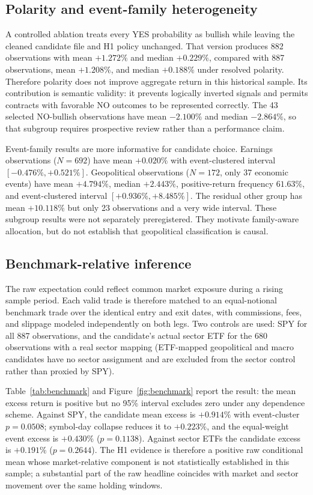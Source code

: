 \documentclass[sigconf,anonymous]{acmart}
\begin{document}
\subsection{Polarity and event-family heterogeneity}

A controlled ablation treats every YES probability as bullish while leaving the cleaned candidate file and H1 policy unchanged. That version produces 882 observations with mean $+1.272\%$ and median $+0.229\%$, compared with 887 observations, mean $+1.208\%$, and median $+0.188\%$ under resolved polarity. Therefore polarity does not improve aggregate return in this historical sample. Its contribution is semantic validity: it prevents logically inverted signals and permits contracts with favorable NO outcomes to be represented correctly. The 43 selected NO-bullish observations have mean $-2.100\%$ and median $-2.864\%$, so that subgroup requires prospective review rather than a performance claim.

Event-family results are more informative for candidate choice. Earnings observations ($N=692$) have mean $+0.020\%$ with event-clustered interval $[-0.476\%,+0.521\%]$. Geopolitical observations ($N=172$, only 37 economic events) have mean $+4.794\%$, median $+2.443\%$, positive-return frequency $61.63\%$, and event-clustered interval $[+0.936\%,+8.485\%]$. The residual other group has mean $+10.118\%$ but only 23 observations and a very wide interval. These subgroup results were not separately preregistered. They motivate family-aware allocation, but do not establish that geopolitical classification is causal.

\subsection{Benchmark-relative inference}
\label{sec:benchmark}

The raw expectation could reflect common market exposure during a rising sample period. Each valid trade is therefore matched to an equal-notional benchmark trade over the identical entry and exit dates, with commissions, fees, and slippage modeled independently on both legs. Two controls are used: SPY for all 887 observations, and the candidate's actual sector ETF for the 680 observations with a real sector mapping (ETF-mapped geopolitical and macro candidates have no sector assignment and are excluded from the sector control rather than proxied by SPY).



Table~\ref{tab:benchmark} and Figure~\ref{fig:benchmark} report the result: the mean excess return is positive but no 95\% interval excludes zero under any dependence scheme. Against SPY, the candidate mean excess is $+0.914\%$ with event-cluster $p=0.0508$; symbol-day collapse reduces it to $+0.223\%$, and the equal-weight event excess is $+0.430\%$ ($p=0.1138$). Against sector ETFs the candidate excess is $+0.191\%$ ($p=0.2644$). The H1 evidence is therefore a positive raw conditional mean whose market-relative component is not statistically established in this sample; a substantial part of the raw headline coincides with market and sector movement over the same holding windows.
\end{document}
